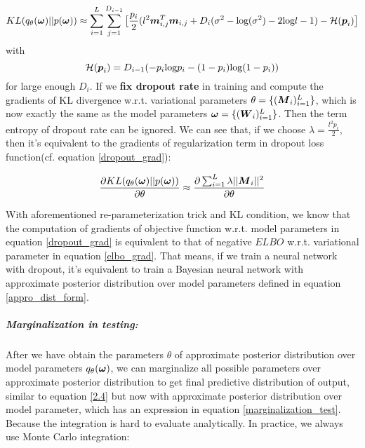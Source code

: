 \begin{equation}
\begin{aligned} \label{kl_condition}
KL(q_{\theta}(\boldsymbol \omega) || p(\boldsymbol \omega)) \approx \sum_{i=1}^{L} \sum_{j=1}^{D_{i-1}}
\big[
\frac{p_{i}}{2}(l^{2}\boldsymbol m_{i,j}^{T} \boldsymbol m_{i,j} + D_{i}( \sigma^{2} -\text{log}(\sigma^{2}) -2\text{log} l- 1) - \mathcal H (\boldsymbol p_{i}) 
\big] 
\end{aligned} 
\end{equation}
with 
\[
\mathcal H(\boldsymbol p_{i}) = D_{i-1}(-p_{i}\text{log}p_{i} - (1-p_{i})\text{log}(1-p_{i}))
\]
for large enough $D_{i}$. If we \textbf{fix dropout rate} in training and compute the gradients of KL divergence w.r.t. variational parameters $\theta = \{(\boldsymbol M_{i})_{i=1}^{L} \}$, which is now exactly the same as the model parameters $\boldsymbol \omega = \{(\boldsymbol W_i)_{i=1}^L\}$. Then the term entropy of dropout rate can be ignored.  We can see that, if we choose $\lambda = \frac{l^{2}p_{i}}{2}$, then it's equivalent to the gradients of regularization term in dropout loss function(cf. equation \ref{dropout_grad}):

\begin{equation} 
\begin{aligned}\label{KL_grad}
\frac{\partial KL(q_{\theta}(\boldsymbol \omega)||p(\boldsymbol \omega))}{\partial \theta} \approx \frac{\partial \sum_{i=1}^{L}\lambda||\boldsymbol M_{i}||^{2}}{\partial \theta}
\end{aligned}
\end{equation}

With aforementioned re-parameterization trick and KL condition, we know that the computation of gradients of objective function w.r.t. model parameters in equation \ref{dropout_grad} is equivalent to that of negative $ELBO$ w.r.t. variational parameter in equation \ref{elbo_grad}. That means, if we train a neural network with dropout, it's equivalent to train a Bayesian neural network with approximate posterior distribution over model parameters defined in equation \ref{appro_dist_form}.

\subparagraph{Marginalization in testing:}
After we have obtain the parameters $\theta$ of approximate posterior distribution over model parameters $q_{\theta}(\boldsymbol \omega)$, we can marginalize all possible parameters over approximate posterior distribution to get final predictive distribution of output, similar to equation \ref{2.4} but now with approximate posterior distribution over model parameter, which has an expression in equation \ref{marginalization_test}. Because the integration is hard to evaluate analytically. In practice, we always use Monte Carlo integration:

